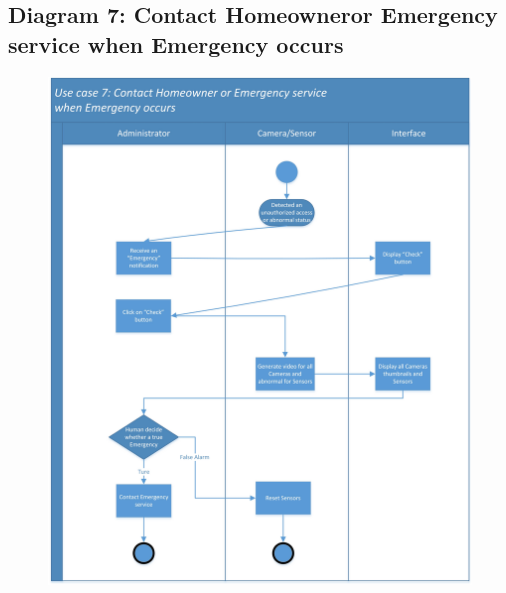 \documentclass[twoside,11pt]{article}
\begin{document}
\subsection{Diagram 7: Contact Homeowneror Emergency service when Emergency occurs}
\begin{figure}[H]
    \centering
    \includegraphics[width=0.8\columnwidth]{SwimLaneDiagram/Usecase_7.jpg}
\end{figure}
\vskip 0.2in


\end{document}
